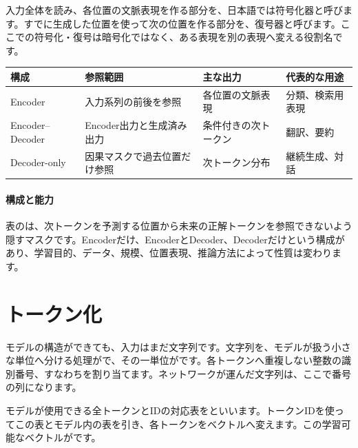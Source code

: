 入力全体を読み、各位置の文脈表現を作る部分を、日本語では符号化器と呼びます。すでに生成した位置を使って次の位置を作る部分を、復号器と呼びます。ここでの符号化・復号は暗号化ではなく、ある表現を別の表現へ変える役割名です。

\begingroup
  \noindent
  \begin{tabularx}{\textwidth}{@{}lYYY@{}}
    \toprule
    構成 & 参照範囲 & 主な出力 & 代表的な用途\\
    \midrule
    Encoder & 入力系列の前後を参照 & 各位置の文脈表現 & 分類、検索用表現\\
    Encoder--Decoder & Encoder出力と生成済み出力 & 条件付きの次トークン & 翻訳、要約\\
    Decoder-only & 因果マスクで過去位置だけ参照 & 次トークン分布 & 継続生成、対話\\
    \bottomrule
  \end{tabularx}
  \vspace{4mm}
\paragraph{構成と能力}
    表のは、次トークンを予測する位置から未来の正解トークンを参照できないよう隠すマスクです。Encoderだけ、EncoderとDecoder、Decoderだけという構成があり、学習目的、データ、規模、位置表現、推論方法によって性質は変わります。

\par
\endgroup


\section{トークン化}
\label{sec:06-machine-learning-27}

モデルの構造ができても、入力はまだ文字列です。文字列を、モデルが扱う小さな単位へ分ける処理がで、その一単位がです。各トークンへ重複しない整数の識別番号、すなわちを割り当てます。ネットワークが運んだ文字列は、ここで番号の列になります。

モデルが使用できる全トークンとIDの対応表をといいます。トークンIDを使ってこの表とモデル内の表を引き、各トークンをベクトルへ変えます。この学習可能なベクトルがです。

\begingroup
  \centering
  \vspace{5mm}
\begingroup
